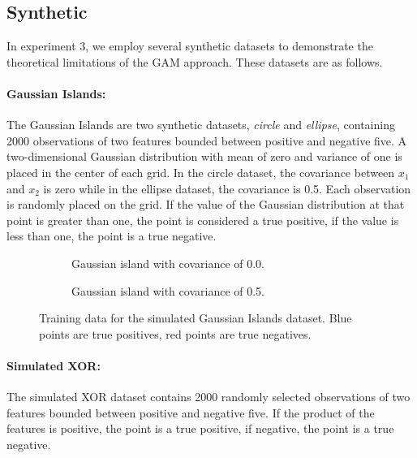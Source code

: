 \subsection{Synthetic}

In experiment 3, we employ several synthetic datasets to demonstrate the theoretical limitations of the GAM approach. These datasets are as follows. 

\paragraph{Gaussian Islands:} The Gaussian Islands are two synthetic datasets, \textit{circle} and \textit{ellipse}, containing 2000 observations of two features bounded between positive and negative five. A two-dimensional Gaussian distribution with mean of zero and variance of one is placed in the center of each grid. In the circle dataset, the covariance between $x_1$ and $x_2$ is zero while in the ellipse dataset, the covariance is 0.5. Each observation is randomly placed on the grid. If the value of the Gaussian distribution at that point is greater than one, the point is considered a true positive, if the value is less than one, the point is a true negative. 

\begin{figure}
\centering
\begin{subfigure}{.5\textwidth}
  \centering
  
  \caption{Gaussian island with covariance of 0.0.}
\end{subfigure}%
\begin{subfigure}{.5\textwidth}
  \centering
  
  \caption{Gaussian island with covariance of 0.5.}
\end{subfigure}
\caption{Training data for the simulated Gaussian Islands dataset. Blue points are true positives, red points are true negatives.}
\label{fig:gaussian_islands}
\end{figure}

\paragraph{Simulated XOR:} \citep{Hara2016MakingInterpretable} The simulated XOR dataset contains 2000 randomly selected observations of two features bounded between positive and negative five. If the product of the features is positive, the point is a true positive, if negative, the point is a true negative. 

